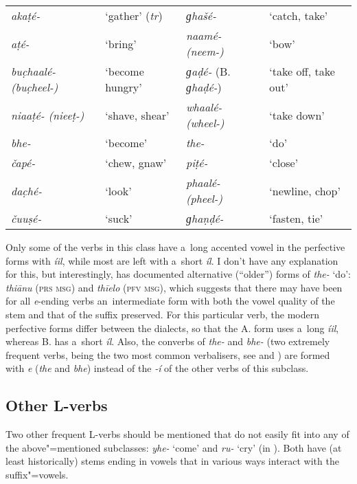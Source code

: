 \begin{table}[H]
\begin{tabularx}{\textwidth}{ Q Q Q Q }
\textit{akaṭé-} &
`gather' (\textit{tr}) &
\textit{ɡhašé-} &
`catch, take'\\
\textit{aṭé-} &
`bring' &
\textit{naamé- (neem-)} &
`bow'\\
\textit{buc̣haalé- (buc̣heel-)} &
`become hungry' &
\textit{ɡaḍé-} (B. \textit{ɡhaḍé-}) &
`take off, take out'\\
\textit{niaaṭé- (nieeṭ-)} &
`shave, shear' &
\textit{whaalé- (wheel-)} &
`take down'\\
\textit{bhe-} &
`become' &
\textit{the-} &
`do'\\
\textit{čapé-} &
`chew, gnaw' &
\textit{piṭé-} &
`close'\\
\textit{dac̣hé-} &
`look' &
\textit{phaalé- (pheel-)} &
`newline, chop'\\
\textit{čuuṣé-} &
`suck' &
\textit{ɡhaṇḍé-} &
`fasten, tie' \\
\end{tabularx}
\end{table}


Only some of the verbs in this class have a~long accented vowel in the perfective forms with
\textit{íil}, while most are left with a~short \textit{íl}. I don't have any explanation for
this, but interestingly, \citet[22--23]{morgenstierne1941} has documented alternative (``older'')
forms of \textit{the-} `do': \textit{thiānu} (\textsc{prs msg}) and \textit{thīelo}
(\textsc{pfv msg}), which suggests that there may have been for all \textit{e}-ending verbs
an~intermediate form with both the vowel quality of the stem and that of the suffix preserved. For
this particular verb, the modern perfective forms differ between the dialects, so that the A. form
uses a~long \textit{íil}, whereas B. has a~short \textit{íl}. Also, the converbs of
\textit{the-} and \textit{bhe-} (two extremely frequent verbs, being the two most common
verbalisers, see  and ) are formed with \textit{e}
(\textit{the} and \textit{bhe}) instead of the \textit{-í} of the other verbs of this subclass.


\subsection{Other L-verbs}
\label{subsec:8-3-4}


Two other frequent L-verbs should be mentioned that do not easily fit into any of the above"=mentioned subclasses: \textit{yhe-} `come' and \textit{ru-} `cry' (in ). Both have (at least historically) stems ending in vowels that in various ways interact with the suffix"=vowels. 


